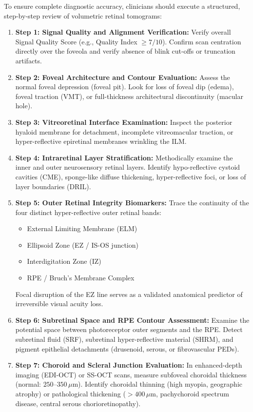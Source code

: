 \documentclass[11pt,a4paper]{article}
\begin{document}
To ensure complete diagnostic accuracy, clinicians should execute a structured, step-by-step review of volumetric retinal tomograms:

\begin{enumerate}[leftmargin=*]
    \item \textbf{Step 1: Signal Quality and Alignment Verification:} Verify overall Signal Quality Score (e.g., Quality Index $\ge 7/10$). Confirm scan centration directly over the foveola and verify absence of blink cut-offs or truncation artifacts.
    \item \textbf{Step 2: Foveal Architecture and Contour Evaluation:} Assess the normal foveal depression (foveal pit). Look for loss of foveal dip (edema), foveal traction (VMT), or full-thickness architectural discontinuity (macular hole).
    \item \textbf{Step 3: Vitreoretinal Interface Examination:} Inspect the posterior hyaloid membrane for detachment, incomplete vitreomacular traction, or hyper-reflective epiretinal membranes wrinkling the ILM.
    \item \textbf{Step 4: Intraretinal Layer Stratification:} Methodically examine the inner and outer neurosensory retinal layers. Identify hypo-reflective cystoid cavities (CME), sponge-like diffuse thickening, hyper-reflective foci, or loss of layer boundaries (DRIL).
    \item \textbf{Step 5: Outer Retinal Integrity Biomarkers:} Trace the continuity of the four distinct hyper-reflective outer retinal bands:
    \begin{itemize}
        \item External Limiting Membrane (ELM)
        \item Ellipsoid Zone (EZ / IS-OS junction)
        \item Interdigitation Zone (IZ)
        \item RPE / Bruch's Membrane Complex
    \end{itemize}
    Focal disruption of the EZ line serves as a validated anatomical predictor of irreversible visual acuity loss.
    \item \textbf{Step 6: Subretinal Space and RPE Contour Assessment:} Examine the potential space between photoreceptor outer segments and the RPE. Detect subretinal fluid (SRF), subretinal hyper-reflective material (SHRM), and pigment epithelial detachments (drusenoid, serous, or fibrovascular PEDs).
    \item \textbf{Step 7: Choroid and Scleral Junction Evaluation:} In enhanced-depth imaging (EDI-OCT) or SS-OCT scans, measure subfoveal choroidal thickness (normal: $250\text{--}350\,\mu\text{m}$). Identify choroidal thinning (high myopia, geographic atrophy) or pathological thickening ($> 400\,\mu\text{m}$, pachychoroid spectrum disease, central serous chorioretinopathy).
\end{enumerate}
\end{document}
